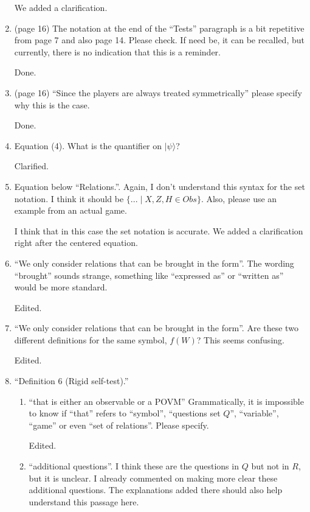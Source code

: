 \documentclass[12pt]{article}
\begin{document}
\begin{enumerate}
{\color{blue} We added a clarification.}

 \item (page 16) The notation at the end of the ``Tests'' paragraph is a bit repetitive from page 7 and also page 14. Please check. If need be, it can be recalled, but currently, there is no indication that this is a reminder.

{\color{blue} Done.}

 \item (page 16) ``Since the players are always treated symmetrically'' please specify why this is the case.

{\color{blue} Done.}

 \item Equation (4). What is the quantifier on $|\psi\rangle$?

{\color{blue} Clarified.}

 \item Equation below ``Relations.''. Again, I don't understand this syntax for the set notation. I think it should be $\{... \mid X, Z, H \in Obs\}$. Also, please use an example from an actual game.

{\color{blue} I think that in this case the set notation is accurate. We added a clarification right after the centered equation.}

 \item ``We only consider relations that can be brought in the form''. The wording ``brought'' sounds strange, something like ``expressed as'' or ``written as'' would be more standard.

{\color{blue} Edited.}

     \item ``We only consider relations that can be brought in the form''. Are these two different definitions for the same symbol, $f(W)$? This seems confusing.
		
		{\color{blue} Edited.}

\item  ``Definition 6 (Rigid self-test).''
\begin{enumerate}
\item ``that is either an observable or a POVM'' Grammatically, it is impossible to know if ``that'' refers to ``symbol'', ``questions set $Q$'', ``variable'', ``game'' or even ``set of relations''. Please specify.

		{\color{blue} Edited.}

\item ``additional questions''.   I think these are the questions in $Q$ but not in $R$, but it is unclear. I already commented on making more clear these additional questions. The explanations added there should also help understand this passage here.


\end{enumerate}
\end{enumerate}
\end{document}
